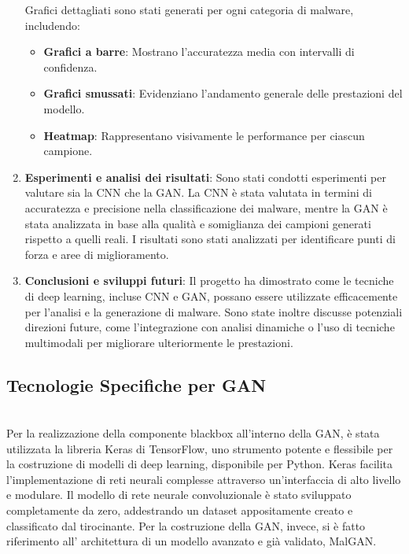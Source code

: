 \begin{enumerate}
    Grafici dettagliati sono stati generati per ogni categoria di malware, includendo:
    \begin{itemize}
        \item \textbf{Grafici a barre}: Mostrano l'accuratezza media con intervalli di confidenza.
        \item \textbf{Grafici smussati}: Evidenziano l'andamento generale delle prestazioni del modello.
        \item \textbf{Heatmap}: Rappresentano visivamente le performance per ciascun campione.
    \end{itemize}

    \item \textbf{Esperimenti e analisi dei risultati}: 
    Sono stati condotti esperimenti per valutare sia la CNN che la GAN. La CNN è stata valutata in termini di accuratezza e precisione nella classificazione dei malware, mentre la GAN è stata analizzata in base alla qualità e somiglianza dei campioni generati rispetto a quelli reali. I risultati sono stati analizzati per identificare punti di forza e aree di miglioramento.

    \item \textbf{Conclusioni e sviluppi futuri}: 
    Il progetto ha dimostrato come le tecniche di deep learning, incluse CNN e GAN, possano essere utilizzate efficacemente per l'analisi e la generazione di malware. Sono state inoltre discusse potenziali direzioni future, come l'integrazione con analisi dinamiche o l'uso di tecniche multimodali per migliorare ulteriormente le prestazioni.
\end{enumerate}


\subsection{Tecnologie Specifiche per GAN}
~\\
\indent Per la realizzazione della componente blackbox all'interno della GAN, è stata utilizzata la libreria Keras di TensorFlow, uno strumento potente e flessibile per la costruzione di modelli di deep learning, disponibile per Python. Keras facilita l'implementazione di reti neurali complesse attraverso un'interfaccia di alto livello e modulare.
Il modello di rete neurale convoluzionale è stato sviluppato completamente da zero, addestrando un dataset appositamente creato e classificato dal tirocinante. Per la costruzione della GAN, invece, si è fatto riferimento all' architettura di un modello avanzato e già validato, MalGAN.\cite{site:malgan}


